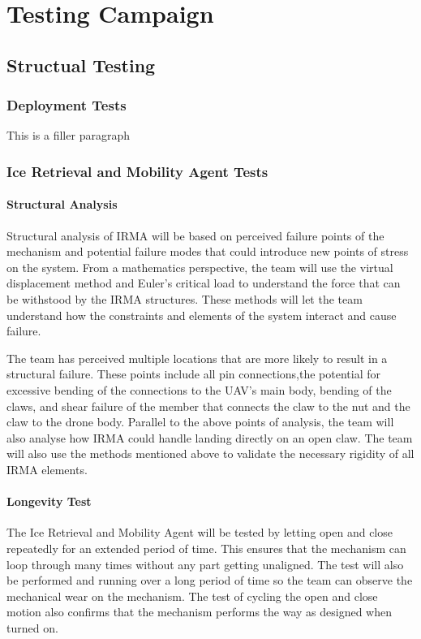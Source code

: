 \chapter{Testing Campaign}

\section{Structual Testing}\label{PL:Testing:Structural}
	\subsection{Deployment Tests}
		This is a filler paragraph

	\subsection{Ice Retrieval and Mobility Agent Tests}
		\subsubsection{Structural Analysis}
		Structural analysis of IRMA will be based on perceived failure points of the mechanism and potential failure modes that could introduce new points of stress on the system.  From a  mathematics perspective, the team will use the virtual displacement method and Euler’s critical load to understand the force that can be withstood by the IRMA structures.  These methods will let the team understand how the constraints and elements of the system interact and cause failure.

		The team has perceived multiple locations that are more likely to result in a structural failure.  These points include all pin connections,the potential for excessive bending of the connections to the UAV’s main body, bending of the claws, and shear failure of the member that connects the claw to the nut and the claw to the drone body.  Parallel to the above points of analysis, the team will also analyse how IRMA could handle landing directly on an open claw.  The team will also use the methods mentioned above to validate the necessary rigidity of all IRMA elements.
		
		\subsubsection{Longevity Test}
		The Ice Retrieval and Mobility Agent will be tested by letting open and close repeatedly for an extended period of time. This ensures that the mechanism can loop through many times without any part getting unaligned. The test will also be performed and running over a long period of time so the team can observe the mechanical wear on the mechanism. The test of cycling the open and close motion also confirms that the mechanism performs the way as designed when turned on. 
